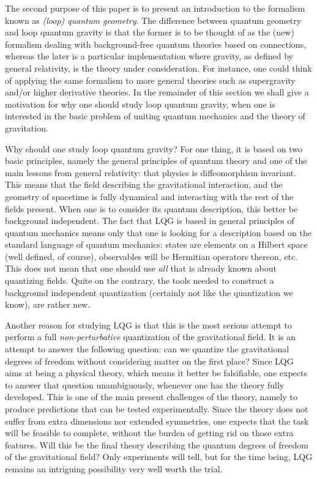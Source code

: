 \documentclass[aps,prd,tightenlines,showpacs,nofootinbib,preprint]{revtex4}
\begin{document}
The second purpose of this paper is to present an introduction to
the formalism known as {\it(loop) quantum geometry}. The
difference between quantum geometry and loop quantum gravity is
that the former is  to be thought of as the (new) formalism
dealing with background-free quantum theories based on
connections, whereas the later is a particular implementation
where gravity, as defined by general relativity, is the theory
under consideration. For instance, one could think of applying the
same formalism to more general theories such as supergravity
and/or higher derivative theories. In the remainder of this
section we shall give a motivation for why one should study loop
quantum gravity, when one is interested in the basic problem of
uniting quantum mechanics and the theory of gravitation.

Why should one study loop quantum gravity? For one thing, it is
based on two basic principles, namely the general principles of
quantum theory and one of the main lessons from general
relativity: that physics is diffeomorphism invariant. This means
that the field describing the gravitational interaction, and the
geometry of spacetime is fully dynamical and interacting with the
rest of the fields present. When one is to consider its quantum
description, this better be background independent. The fact that
LQG is based in general principles of quantum mechanics means only
that one is looking for a description based on the standard
language of quantum mechanics: states are elements on a Hilbert
space (well defined, of course), observables will be Hermitian
operators thereon, etc. This does not mean that one should use
{\it all} that is already known about quantizing fields. Quite on
the contrary, the tools needed to construct a background
independent quantization (certainly not like the quantization we
know), are rather new.

Another reason for studying LQG is that this is the most serious
attempt to perform a full {\it non-perturbative} quantization of
the gravitational field. It is an attempt to answer the following
question: can we quantize the gravitational degrees of freedom
without considering matter on the first place? Since LQG aims at
being a physical theory, which means it better be falsifiable, one
expects to answer that question unambiguously, whenever one has
the theory fully developed. This is one of the main present
challenges of the theory, namely to produce predictions that can
be tested experimentally. Since the theory does not suffer from
extra dimensions nor extended symmetries, one expects that the
task will be feasible to complete, without the burden of getting
rid on those extra features. Will this be the final theory
describing the quantum degrees of freedom of the gravitational
field? Only experiments will tell, but for the time being, LQG
remains an intriguing possibility very well worth the trial.
\end{document}
